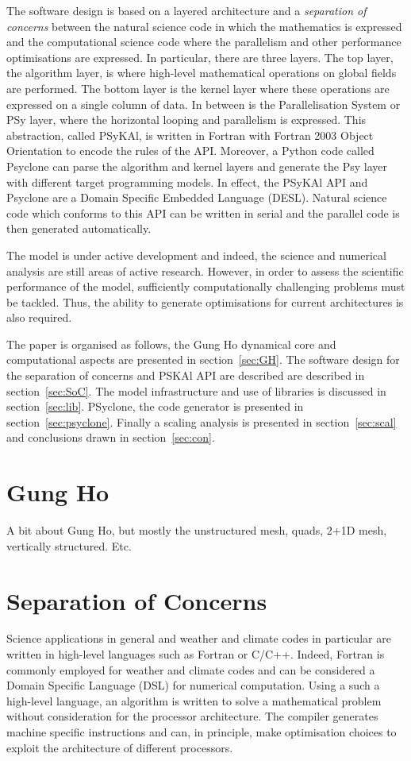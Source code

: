 \documentclass[times]{elsarticle}
\begin{document}
The software design is based on a layered architecture and a 
{\em separation of concerns} between the natural science code in which
the mathematics is expressed and the computational science code where the
parallelism and other performance optimisations are expressed. In particular,
there are three layers. The top layer, the algorithm layer, is where high-level mathematical 
operations on global fields are performed. The bottom layer is the kernel layer
where these operations are expressed on a single column of data. In between is the
Parallelisation System or PSy layer, where the horizontal looping and parallelism is
expressed. This abstraction, called PSyKAl, is written in Fortran with Fortran 2003
Object Orientation to encode the rules of the API.
Moreover, a Python code called Psyclone can parse the algorithm and kernel layers and
generate the Psy layer with different target programming models. In effect, the PSyKAl API
and Psyclone are a Domain Specific Embedded Language (DESL). Natural science code which
conforms to this API can be written in serial and the parallel code is then generated automatically.

The model is under active development and indeed, the science and
numerical analysis are still areas of active research. However, in
order to assess the scientific performance of the model, sufficiently
computationally challenging problems must be tackled. Thus, the
ability to generate optimisations for current architectures is also
required. 

The paper is organised as follows, the Gung Ho dynamical core and
computational aspects are presented in section~\ref{sec:GH}. The
software design for the separation of concerns and PSKAl API are described 
are described in section~\ref{sec:SoC}. The model infrastructure and
use of libraries is discussed in section~\ref{sec:lib}. PSyclone, the
code generator is presented in section~\ref{sec:psyclone}. Finally a
scaling analysis is presented in section~\ref{sec:scal} and
conclusions drawn in section~\ref{sec:con}.

\section{\label{sec:GH}Gung Ho}
A bit about Gung Ho, but mostly the unstructured mesh, quads, 2+1D
mesh, vertically structured. Etc.

\section{\label{sec:SoC}Separation of Concerns}
Science applications in general and weather and climate codes in
particular are written in high-level languages such as Fortran or
C/C++. Indeed, Fortran is commonly employed for weather and climate
codes and can be considered a Domain Specific Language (DSL) for
numerical computation. Using a such a high-level language, an
algorithm is written to solve a mathematical problem without
consideration for the processor architecture. The compiler generates
machine specific instructions and can, in principle, make optimisation
choices to exploit the architecture of different processors.
\end{document}
